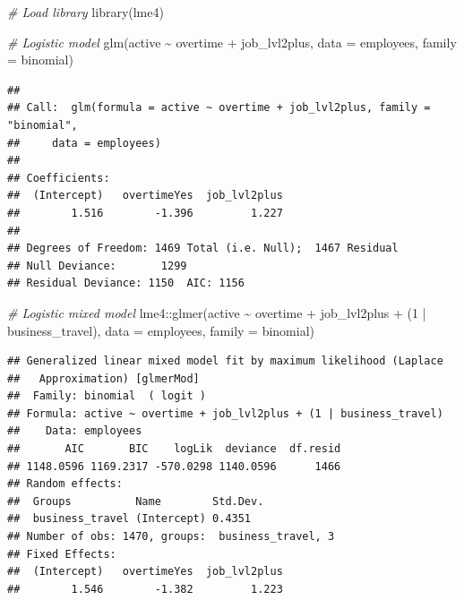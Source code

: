 \documentclass[
]{book}
\newenvironment{Shaded}{\begin{snugshade}}{\end{snugshade}}
\newcommand{\AttributeTok}[1]{\textcolor[rgb]{0.77,0.63,0.00}{#1}}
\newcommand{\CommentTok}[1]{\textcolor[rgb]{0.56,0.35,0.01}{\textit{#1}}}
\newcommand{\DecValTok}[1]{\textcolor[rgb]{0.00,0.00,0.81}{#1}}
\newcommand{\FunctionTok}[1]{\textcolor[rgb]{0.00,0.00,0.00}{#1}}
\newcommand{\NormalTok}[1]{#1}
\newcommand{\SpecialCharTok}[1]{\textcolor[rgb]{0.00,0.00,0.00}{#1}}
\newcommand{\StringTok}[1]{\textcolor[rgb]{0.31,0.60,0.02}{#1}}
\begin{document}
\begin{Shaded}
\begin{Highlighting}[]
\CommentTok{\# Load library}
\FunctionTok{library}\NormalTok{(lme4)}

\CommentTok{\# Logistic model}
\FunctionTok{glm}\NormalTok{(active }\SpecialCharTok{\textasciitilde{}}\NormalTok{ overtime }\SpecialCharTok{+}\NormalTok{ job\_lvl2plus, }\AttributeTok{data =}\NormalTok{ employees, }\AttributeTok{family =} \StringTok{\textquotesingle{}binomial\textquotesingle{}}\NormalTok{)}
\end{Highlighting}
\end{Shaded}

\begin{verbatim}
## 
## Call:  glm(formula = active ~ overtime + job_lvl2plus, family = "binomial", 
##     data = employees)
## 
## Coefficients:
##  (Intercept)   overtimeYes  job_lvl2plus  
##        1.516        -1.396         1.227  
## 
## Degrees of Freedom: 1469 Total (i.e. Null);  1467 Residual
## Null Deviance:       1299 
## Residual Deviance: 1150  AIC: 1156
\end{verbatim}

\begin{Shaded}
\begin{Highlighting}[]
\CommentTok{\# Logistic mixed model}
\NormalTok{lme4}\SpecialCharTok{::}\FunctionTok{glmer}\NormalTok{(active }\SpecialCharTok{\textasciitilde{}}\NormalTok{ overtime }\SpecialCharTok{+}\NormalTok{ job\_lvl2plus }\SpecialCharTok{+}\NormalTok{ (}\DecValTok{1} \SpecialCharTok{|}\NormalTok{ business\_travel), }\AttributeTok{data =}\NormalTok{ employees, }\AttributeTok{family =} \StringTok{\textquotesingle{}binomial\textquotesingle{}}\NormalTok{)}
\end{Highlighting}
\end{Shaded}

\begin{verbatim}
## Generalized linear mixed model fit by maximum likelihood (Laplace
##   Approximation) [glmerMod]
##  Family: binomial  ( logit )
## Formula: active ~ overtime + job_lvl2plus + (1 | business_travel)
##    Data: employees
##       AIC       BIC    logLik  deviance  df.resid 
## 1148.0596 1169.2317 -570.0298 1140.0596      1466 
## Random effects:
##  Groups          Name        Std.Dev.
##  business_travel (Intercept) 0.4351  
## Number of obs: 1470, groups:  business_travel, 3
## Fixed Effects:
##  (Intercept)   overtimeYes  job_lvl2plus  
##        1.546        -1.382         1.223
\end{verbatim}
\end{document}
